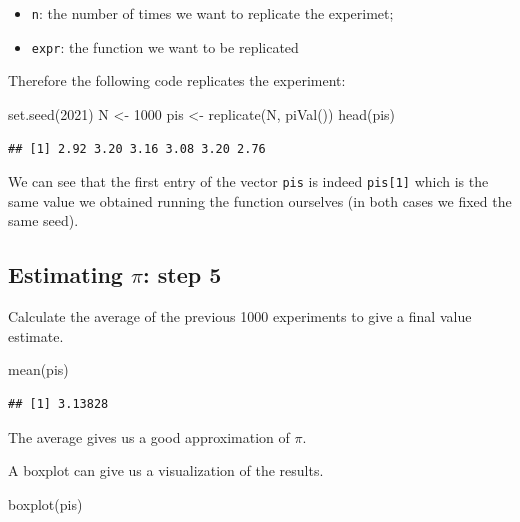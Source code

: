 \documentclass[
]{book}
\newenvironment{Shaded}{\begin{snugshade}}{\end{snugshade}}
\newcommand{\DecValTok}[1]{\textcolor[rgb]{0.00,0.00,0.81}{#1}}
\newcommand{\FunctionTok}[1]{\textcolor[rgb]{0.00,0.00,0.00}{#1}}
\newcommand{\NormalTok}[1]{#1}
\newcommand{\OtherTok}[1]{\textcolor[rgb]{0.56,0.35,0.01}{#1}}
\begin{document}
\begin{itemize}
\item
  \texttt{n}: the number of times we want to replicate the experimet;
\item
  \texttt{expr}: the function we want to be replicated
\end{itemize}

Therefore the following code replicates the experiment:

\begin{Shaded}
\begin{Highlighting}[]
\FunctionTok{set.seed}\NormalTok{(}\DecValTok{2021}\NormalTok{)}
\NormalTok{N }\OtherTok{\textless{}{-}} \DecValTok{1000}
\NormalTok{pis }\OtherTok{\textless{}{-}} \FunctionTok{replicate}\NormalTok{(N, }\FunctionTok{piVal}\NormalTok{())}
\FunctionTok{head}\NormalTok{(pis)}
\end{Highlighting}
\end{Shaded}

\begin{verbatim}
## [1] 2.92 3.20 3.16 3.08 3.20 2.76
\end{verbatim}

We can see that the first entry of the vector \texttt{pis} is indeed \texttt{pis{[}1{]}} which is the same value we obtained running the function ourselves (in both cases we fixed the same seed).

\hypertarget{estimating-pi-step-5}{%
\subsection{\texorpdfstring{Estimating \(\pi\): step 5}{Estimating \textbackslash pi: step 5}}\label{estimating-pi-step-5}}

Calculate the average of the previous 1000 experiments to give a final value estimate.

\begin{Shaded}
\begin{Highlighting}[]
\FunctionTok{mean}\NormalTok{(pis)}
\end{Highlighting}
\end{Shaded}

\begin{verbatim}
## [1] 3.13828
\end{verbatim}

The average gives us a good approximation of \(\pi\).

A boxplot can give us a visualization of the results.

\begin{Shaded}
\begin{Highlighting}[]
\FunctionTok{boxplot}\NormalTok{(pis)}
\end{Highlighting}
\end{Shaded}
\end{document}
